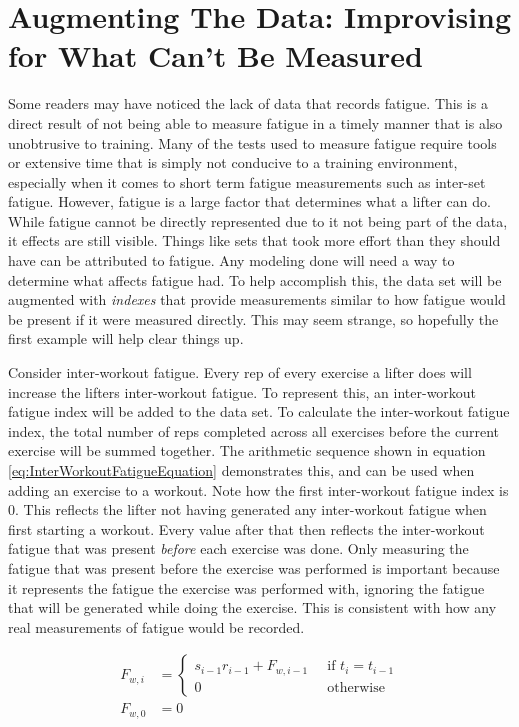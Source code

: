 \section{Augmenting The Data: Improvising for What Can't Be Measured}
\label{sec:AugmentedDataSet}

Some readers may have noticed the lack of data that records fatigue. This is a direct result of not being able to measure fatigue in a timely manner that is also unobtrusive to training. Many of the tests used to measure fatigue require tools or extensive time that is simply not conducive to a training environment, especially when it comes to short term fatigue measurements such as inter-set fatigue. However, fatigue is a large factor that determines what a lifter can do. While fatigue cannot be directly represented due to it not being part of the data, it effects are still visible. Things like sets that took more effort than they should have can be attributed to fatigue. Any modeling done will need a way to determine what affects fatigue had. To help accomplish this, the data set will be augmented with \textit{indexes} that provide measurements similar to how fatigue would be present if it were measured directly. This may seem strange, so hopefully the first example will help clear things up.

Consider inter-workout fatigue. Every rep of every exercise a lifter does will increase the lifters inter-workout fatigue. To represent this, an inter-workout fatigue index will be added to the data set. To calculate the inter-workout fatigue index, the total number of reps completed across all exercises before the current exercise will be summed together. The arithmetic sequence shown in equation \ref{eq:InterWorkoutFatigueEquation} demonstrates this, and can be used when adding an exercise to a workout. Note how the first inter-workout fatigue index is $0$. This reflects the lifter not having generated any inter-workout fatigue when first starting a workout. Every value after that then reflects the inter-workout fatigue that was present \textit{before} each exercise was done. Only measuring the fatigue that was present before the exercise was performed is important because it represents the fatigue the exercise was performed with, ignoring the fatigue that will be generated while doing the exercise. This is consistent with how any real measurements of fatigue would be recorded.

\begin{equation}
	\label{eq:InterWorkoutFatigueEquation}
	\begin{split}
		F_{w,i} & = 
		\begin{cases}
			s_{i-1}r_{i-1}+F_{w,i-1} \;\; & \text{if }t_i=t_{i-1} \\
			0 \;\; & \text{otherwise}
		\end{cases}
		\\
		F_{w,0} & = 0
	\end{split}
\end{equation}

